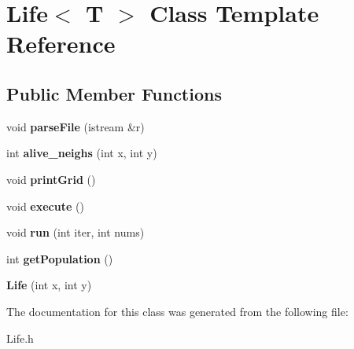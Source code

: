 \hypertarget{classLife}{\section{Life$<$ T $>$ Class Template Reference}
\label{classLife}
}
\subsection*{Public Member Functions}
\begin{DoxyCompactItemize}
\item 
\hypertarget{classLife_a54b6624b13387f6e38df5ecd9f766d16}{void {\bfseries parse\-File} (istream \&r)}\label{classLife_a54b6624b13387f6e38df5ecd9f766d16}

\item 
\hypertarget{classLife_ade3bb83f54dbe14cba1b39e72a0b868f}{int {\bfseries alive\-\_\-neighs} (int x, int y)}\label{classLife_ade3bb83f54dbe14cba1b39e72a0b868f}

\item 
\hypertarget{classLife_a1999b45983564672f38003a484e4958b}{void {\bfseries print\-Grid} ()}\label{classLife_a1999b45983564672f38003a484e4958b}

\item 
\hypertarget{classLife_a82a483ffd963a337bfa8047743dca111}{void {\bfseries execute} ()}\label{classLife_a82a483ffd963a337bfa8047743dca111}

\item 
\hypertarget{classLife_a066f96b1d5434e573a35cf6505c33685}{void {\bfseries run} (int iter, int nums)}\label{classLife_a066f96b1d5434e573a35cf6505c33685}

\item 
\hypertarget{classLife_a5a8da0f57542daabc1712a826c13b051}{int {\bfseries get\-Population} ()}\label{classLife_a5a8da0f57542daabc1712a826c13b051}

\item 
\hypertarget{classLife_a0671eb7c9ecfb698ce14bb48f710e7e6}{{\bfseries Life} (int x, int y)}\label{classLife_a0671eb7c9ecfb698ce14bb48f710e7e6}

\end{DoxyCompactItemize}


The documentation for this class was generated from the following file\-:\begin{DoxyCompactItemize}
\item 
Life.\-h\end{DoxyCompactItemize}

